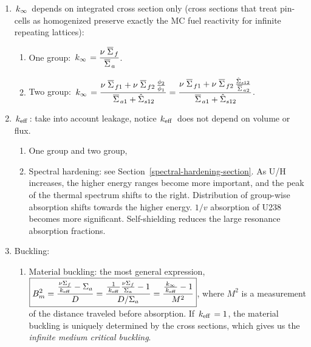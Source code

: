 \documentclass{school-22.211-notes}
\date{April 12, 2012}
\begin{document}
\maketitle

\begin{enumerate}
\item $\left. k_{\infty} \right.$ depends on integrated cross section only (cross sections that treat pin-cells as homogenized preserve exactly the MC fuel reactivity for infinite repeating lattices):
  \begin{enumerate}
  \item One group:  $\displaystyle \left. k_{\infty} \right. = \frac{\nu \left.\overline{\Sigma} \right._f }{\left.\overline{\Sigma} \right._a}$. 
  \item Two group: $\displaystyle \left. k_{\infty} \right. =\frac{\nu \left.\overline{\Sigma} \right._{f1} + \nu \left.\overline{\Sigma} \right._{f2} \frac{ \phi_2 }{\phi_1}}{\left.\overline{\Sigma} \right._{a1} + \hat{\Sigma}_{s12} } = \frac{\nu \left.\overline{\Sigma} \right._{f1} + \nu \left.\overline{\Sigma} \right._{f2} \frac{\hat{\Sigma}_{s12} }{\left.\overline{\Sigma} \right._{a2}}}{\left.\overline{\Sigma} \right._{a1} + \hat{\Sigma}_{s12} } $. 
  \end{enumerate}

\item $\left. k_{\mathrm{eff}} \right.$: take into account leakage, notice $\left. k_{\mathrm{eff}} \right.$ does not depend on volume or flux. 
  \begin{enumerate}
  \item One group and two group, 
  \item Spectral hardening: see Section~\ref{spectral-hardening-section}. As U/H increases, the higher energy ranges become more important, and the peak of the thermal spectrum shifts to the right. Distribution of group-wise absorption shifts towards the higher energy. $1/v$ absorption of U238 becomes more significant. Self-shielding reduces the large resonance absorption fractions.
  \end{enumerate}

\item Buckling: 
  \begin{enumerate}
  \item Material buckling: the most general expression, $\displaystyle \boxed{  B_m^2 = \frac{\frac{\nu \Sigma_f}{\left. k_{\mathrm{eff}} \right.} - \Sigma_a}{D} = \frac{\frac{1}{\left. k_{\mathrm{eff}} \right.} \frac{\nu \Sigma_f}{\Sigma_a} - 1}{D/\Sigma_a} = \frac{\frac{\left. k_{\infty} \right.}{\left. k_{\mathrm{eff}} \right.} - 1}{M^2} } $, where $M^2$ is a measurement of the distance traveled before absorption.     If $\left. k_{\mathrm{eff}} \right. = 1$, the material buckling is uniquely determined by the cross sections, which gives us the \textit{infinite medium critical buckling}. 


\end{enumerate}
\end{enumerate}
\end{document}
